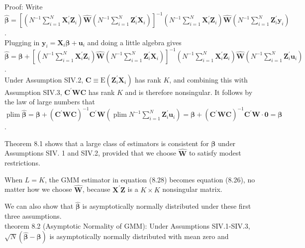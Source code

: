 \documentclass[10pt]{article}
\begin{document}
Proof: Write\\
$\hat{\boldsymbol{\beta}}=\left[\left(N^{-1} \sum_{i=1}^{N} \mathbf{X}_{i}^{\prime} \mathbf{Z}_{i}\right) \hat{\mathbf{W}}\left(N^{-1} \sum_{i=1}^{N} \mathbf{Z}_{i}^{\prime} \mathbf{X}_{i}\right)\right]^{-1}\left(N^{-1} \sum_{i=1}^{N} \mathbf{X}_{i}^{\prime} \mathbf{Z}_{i}\right) \hat{\mathbf{W}}\left(N^{-1} \sum_{i=1}^{N} \mathbf{Z}_{i}^{\prime} \mathbf{y}_{i}\right)$.\\
Plugging in $\mathbf{y}_{i}=\mathbf{X}_{i} \boldsymbol{\beta}+\mathbf{u}_{i}$ and doing a little algebra gives\\
$\hat{\boldsymbol{\beta}}=\boldsymbol{\beta}+\left[\left(N^{-1} \sum_{i=1}^{N} \mathbf{X}_{i}^{\prime} \mathbf{Z}_{i}\right) \hat{\mathbf{W}}\left(N^{-1} \sum_{i=1}^{N} \mathbf{Z}_{i}^{\prime} \mathbf{X}_{i}\right)\right]^{-1}\left(N^{-1} \sum_{i=1}^{N} \mathbf{X}_{i}^{\prime} \mathbf{Z}_{i}\right) \hat{\mathbf{W}}\left(N^{-1} \sum_{i=1}^{N} \mathbf{Z}_{i}^{\prime} \mathbf{u}_{i}\right)$.\\
Under Assumption SIV.2, $\mathbf{C} \equiv \mathrm{E}\left(\mathbf{Z}_{i}^{\prime} \mathbf{X}_{i}\right)$ has rank $K$, and combining this with Assumption SIV.3, $\mathbf{C}^{\prime} \mathbf{W C}$ has rank $K$ and is therefore nonsingular. It follows by the law of large numbers that $\operatorname{plim} \hat{\boldsymbol{\beta}}=\boldsymbol{\beta}+\left(\mathbf{C}^{\prime} \mathbf{W C}\right)^{-1} \mathbf{C}^{\prime} \mathbf{W}\left(\operatorname{plim} N^{-1} \sum_{i=1}^{N} \mathbf{Z}_{i}^{\prime} \mathbf{u}_{i}\right)=\boldsymbol{\beta}+ \left(\mathbf{C}^{\prime} \mathbf{W C}\right)^{-1} \mathbf{C}^{\prime} \mathbf{W} \cdot \mathbf{0}=\boldsymbol{\beta}$.

Theorem 8.1 shows that a large class of estimators is consistent for $\boldsymbol{\beta}$ under Assumptions SIV. 1 and SIV.2, provided that we choose $\hat{\mathbf{W}}$ to satisfy modest restrictions.

When $L=K$, the GMM estimator in equation (8.28) becomes equation (8.26), no matter how we choose $\hat{\mathbf{W}}$, because $\mathbf{X}^{\prime} \mathbf{Z}$ is a $K \times K$ nonsingular matrix.

We can also show that $\hat{\boldsymbol{\beta}}$ is asymptotically normally distributed under these first three assumptions.\\
theorem 8.2 (Asymptotic Normality of GMM): Under Assumptions SIV.1-SIV.3, $\sqrt{N}(\hat{\boldsymbol{\beta}}-\boldsymbol{\beta})$ is asymptotically normally distributed with mean zero and
\end{document}

